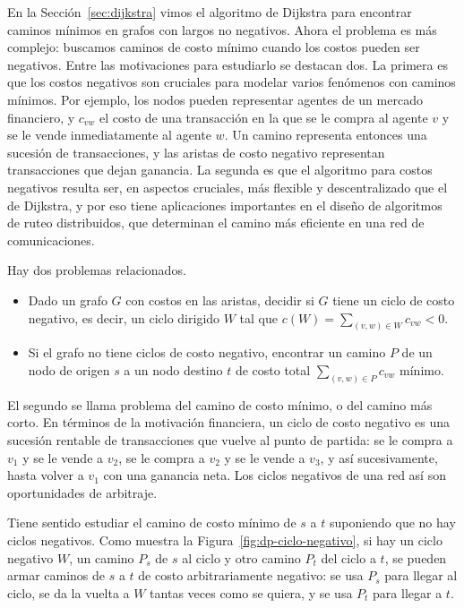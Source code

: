 \documentclass[12pt, spanish, oneside, openany]{book}
\theoremstyle{uprightplain}
\theoremstyle{definition}
\theoremstyle{remark}
\theoremstyle{definition}
\begin{document}
En la Sección~\ref{sec:dijkstra} vimos el algoritmo de Dijkstra para encontrar caminos mínimos en grafos con largos no negativos. Ahora el problema es más complejo: buscamos caminos de costo mínimo cuando los costos pueden ser negativos. Entre las motivaciones para estudiarlo se destacan dos. La primera es que los costos negativos son cruciales para modelar varios fenómenos con caminos mínimos. Por ejemplo, los nodos pueden representar agentes de un mercado financiero, y $c_{vw}$ el costo de una transacción en la que se le compra al agente $v$ y se le vende inmediatamente al agente $w$. Un camino representa entonces una sucesión de transacciones, y las aristas de costo negativo representan transacciones que dejan ganancia. La segunda es que el algoritmo para costos negativos resulta ser, en aspectos cruciales, más flexible y descentralizado que el de Dijkstra, y por eso tiene aplicaciones importantes en el diseño de algoritmos de ruteo distribuidos, que determinan el camino más eficiente en una red de comunicaciones.

Hay dos problemas relacionados.
\begin{itemize}
    \item Dado un grafo $G$ con costos en las aristas, decidir si $G$ tiene un ciclo de costo negativo, es decir, un ciclo dirigido $W$ tal que $c(W)=\sum_{(v,w)\in W}c_{vw}<0$.
    \item Si el grafo no tiene ciclos de costo negativo, encontrar un camino $P$ de un nodo de origen $s$ a un nodo destino $t$ de costo total $\sum_{(v,w)\in P}c_{vw}$ mínimo.
\end{itemize}
El segundo se llama problema del camino de costo mínimo, o del camino más corto. En términos de la motivación financiera, un ciclo de costo negativo es una sucesión rentable de transacciones que vuelve al punto de partida: se le compra a $v_1$ y se le vende a $v_2$, se le compra a $v_2$ y se le vende a $v_3$, y así sucesivamente, hasta volver a $v_1$ con una ganancia neta. Los ciclos negativos de una red así son oportunidades de arbitraje.

Tiene sentido estudiar el camino de costo mínimo de $s$ a $t$ suponiendo que no hay ciclos negativos. Como muestra la Figura~\ref{fig:dp-ciclo-negativo}, si hay un ciclo negativo $W$, un camino $P_s$ de $s$ al ciclo y otro camino $P_t$ del ciclo a $t$, se pueden armar caminos de $s$ a $t$ de costo arbitrariamente negativo: se usa $P_s$ para llegar al ciclo, se da la vuelta a $W$ tantas veces como se quiera, y se usa $P_t$ para llegar a $t$.
\end{document}
